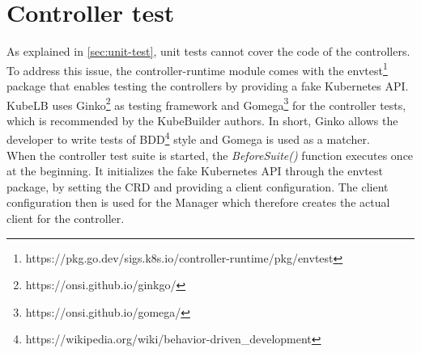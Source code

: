 \section{Controller test}\label{sec:controller-test}

As explained in \autoref{sec:unit-test}, unit tests cannot cover the code of the controllers.
To address this issue, the controller-runtime module comes with the envtest\footnote{https://pkg.go.dev/sigs.k8s.io/controller-runtime/pkg/envtest} package that enables testing the controllers by providing a fake Kubernetes API.
KubeLB uses Ginko\footnote{https://onsi.github.io/ginkgo/} as testing framework and Gomega\footnote{https://onsi.github.io/gomega/} for the controller tests, which is recommended by the KubeBuilder authors.
In short, Ginko allows the developer to write tests of BDD\footnote{https://wikipedia.org/wiki/behavior-driven\_development} style and Gomega is used as a matcher.
\\
When the controller test suite is started, the \textit{BeforeSuite()} function executes once at the beginning.
It initializes the fake Kubernetes API through the envtest package, by setting the CRD and providing a client configuration.
The client configuration then is used for the Manager which therefore creates the actual client for the controller.
